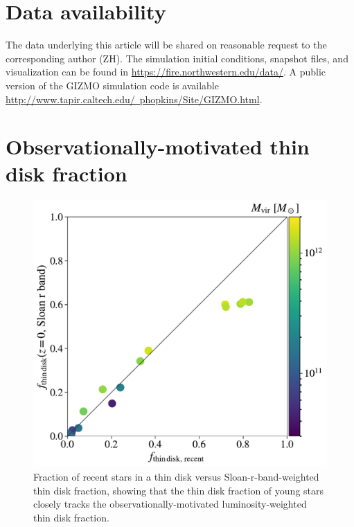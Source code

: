 \documentclass[fleqn,usenatbib]{mnras}
\begin{document}
\section*{Data availability}
The data underlying this article will be shared on reasonable request to the corresponding author (ZH). The simulation initial conditions, snapshot files, and visualization can be found in \href{https://fire.northwestern.edu/data/}{https://fire.northwestern.edu/data/}.
A public version of the GIZMO simulation code is available \href{http://www.tapir.caltech.edu/~phopkins/Site/GIZMO.html}{http://www.tapir.caltech.edu/~phopkins/Site/GIZMO.html}.








\appendix

\section{Observationally-motivated thin disk fraction}
\label{s: appendix-sloan thin disk fraction}

\begin{figure}
    \centering
    \includegraphics[width=\columnwidth]{figures/prevalence/thin_disk_frac_sloanr_v_thin_disk_frac_recent.pdf}
    \caption{
    Fraction of recent stars in a thin disk versus Sloan-r-band-weighted thin disk fraction, showing that the thin disk fraction of young stars closely tracks the observationally-motivated luminosity-weighted thin disk fraction.
    }
    \label{f: thin disk v thin disk}
\end{figure}
\end{document}

